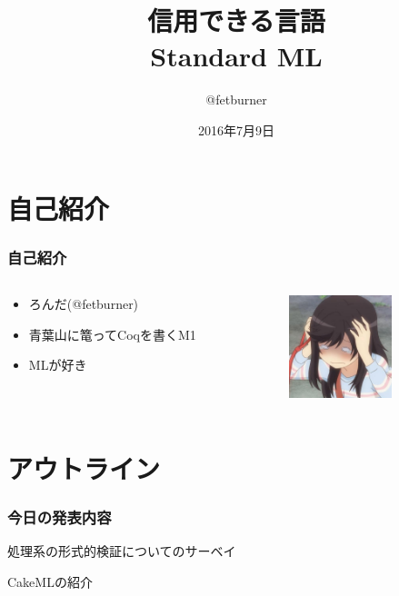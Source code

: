\documentclass[dvipdfmx,cjk,xcolor=dvipsnames,envcountsect,notheorems,12pt]{beamer}
\title{信用できる言語\\Standard ML}
\author{@fetburner}
\date{2016年7月9日}
\theoremstyle{definition}
\begin{document}
\frame[plain]{\titlepage}%



\section{自己紹介}
\begin{frame}
	\frametitle{自己紹介}
	\begin{columns}
		\begin{column}{0.6\textwidth}
			\begin{itemize}
				\item ろんだ(@fetburner)
				\item 青葉山に篭ってCoqを書くM1
				\item MLが好き
			\end{itemize}
		\end{column}
		\begin{column}{0.3\textwidth}
			\begin{center}
				\includegraphics[width=30mm]{icon.jpg}
			\end{center}
		\end{column}
	\end{columns}
\end{frame}

\section{アウトライン}

\begin{frame}
	\frametitle{今日の発表内容}
	\Large
	処理系の形式的検証についてのサーベイ

	\vfill

	CakeMLの紹介
\end{frame}
\end{document}
